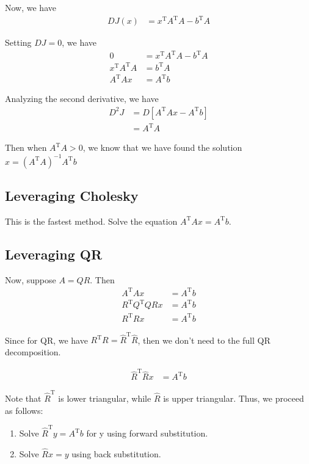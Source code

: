\documentclass{article}
\begin{document}
Now, we have
\begin{align*}
    DJ(x) &= x^\mathrm{T}A^\mathrm{T} A - b^\mathrm{T} A
\end{align*}

Setting $DJ = 0$, we have
\begin{align*}
    0 &= x^\mathrm{T}A^\mathrm{T} A - b^\mathrm{T} A \\
    x^\mathrm{T} A^\mathrm{T} A &= b^\mathrm{T} A \\
    A^\mathrm{T} A x &= A^\mathrm{T} b
\end{align*}

Analyzing the second derivative, we have
\begin{align*}
    D^2 J &= D \left[ A^\mathrm{T} A x - A^\mathrm{T} b \right] \\
    &= A^\mathrm{T} A
\end{align*}

Then when $A^\mathrm{T} A > 0$, we know that we have found the solution $x = (A^\mathrm{T} A)^{-1} A^\mathrm{T} b$

\subsection{Leveraging Cholesky}

This is the fastest method. Solve the equation $A^\mathrm{T} A x = A^\mathrm{T} b$.

\subsection{Leveraging QR}
Now, suppose $A = QR$.
Then
\begin{align*}
    A^\mathrm{T} A x &= A^\mathrm{T} b \\
    R^\mathrm{T} Q^\mathrm{T} Q R x &= A^\mathrm{T} b \\
    R^\mathrm{T} R x &= A^\mathrm{T} b
\end{align*}

Since for QR, we have $R^\mathrm{T} R = \hat{R}^\mathrm{T} \hat{R}$, then we don't need to the full QR decomposition.

\begin{align*}
    \hat{R}^\mathrm{T} \hat{R} x &= A^\mathrm{T} b
\end{align*}

Note that $\hat{R}^\mathrm{T}$ is lower triangular, while $\hat{R}$ is upper triangular. Thus, we proceed as follows:
\begin{enumerate}
    \item Solve $\hat{R}^\mathrm{T} y = A^\mathrm{T} b$ for y using forward substitution.
    \item Solve $\hat{R} x = y$ using back substitution.
\end{enumerate}
\end{document}
